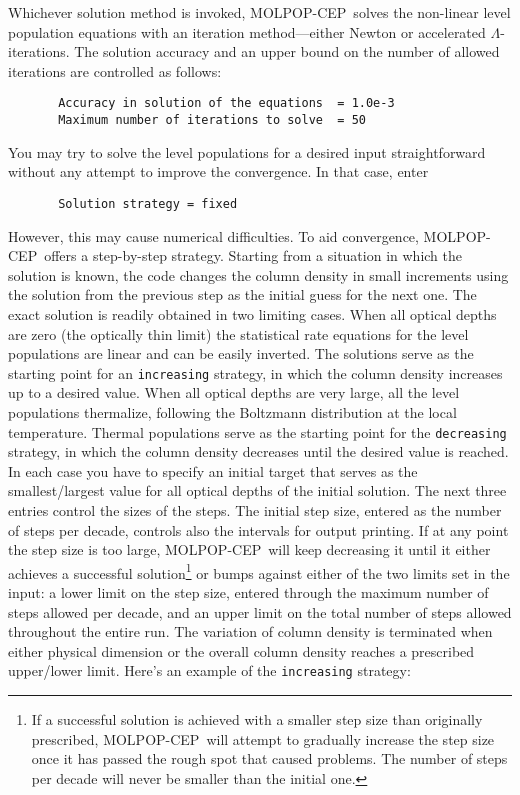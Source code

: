 \documentclass[12pt]{article}
\def\M{MOLPOP-CEP}
\begin{document}
Whichever solution method is invoked, \M\ solves the non-linear level
population equations with an iteration method---either Newton or accelerated
$\Lambda$-iterations. The solution accuracy and an upper bound on the number of
allowed iterations are controlled as follows:
%
\begin{verbatim}
       Accuracy in solution of the equations  = 1.0e-3
       Maximum number of iterations to solve  = 50
\end{verbatim}
You may try to solve the level populations for a desired input straightforward
without any attempt to improve the convergence. In that case, enter
\begin{verbatim}
       Solution strategy = fixed
\end{verbatim}
However, this may cause numerical difficulties. To aid convergence, \M\ offers
a step-by-step strategy. Starting from a situation in which the solution is
known, the code changes the column density in small increments using the
solution from the previous step as the initial guess for the next one. The
exact solution is readily obtained in two limiting cases. When all optical
depths are zero (the optically thin limit) the statistical rate equations for
the level populations are linear and can be easily inverted. The solutions
serve as the starting point for an {\tt increasing} strategy, in which the
column density increases up to a desired value. When all optical depths are
very large, all the level populations thermalize, following the Boltzmann
distribution at the local temperature. Thermal populations serve as the
starting point for the {\tt decreasing} strategy, in which the column density
decreases until the desired value is reached. In each case you have to specify
an initial target that serves as the smallest/largest value for all optical
depths of the initial solution. The next three entries control the sizes of the
steps. The initial step size, entered as the number of steps per decade,
controls also the intervals for output printing. If at any point the step size
is too large, \M\ will keep decreasing it until it either achieves a successful
solution\footnote{If a successful solution is achieved with a smaller step size
than originally prescribed, \M\ will attempt to gradually increase the step
size once it has passed the rough spot that caused problems. The number of
steps per decade will never be smaller than the initial one.} or bumps against
either of the two limits set in the input: a lower limit on the step size,
entered through the maximum number of steps allowed per decade, and an upper
limit on the total number of steps allowed throughout the entire run. The
variation of column density is terminated when either physical dimension or the
overall column density reaches a prescribed upper/lower limit. Here's an
example of the {\tt increasing} strategy:
\end{document}
